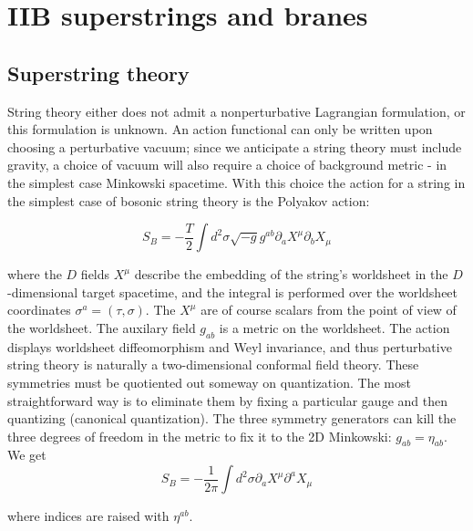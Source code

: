 \documentclass[11pt,a4paper,oneside,openright,titlepage]{book}
\author{Riccardo Antonelli}
\begin{document}
\frontmatter




\tableofcontents

\mainmatter

\chapter{IIB superstrings and branes}

\section{Superstring theory}

String theory either does not admit a nonperturbative Lagrangian formulation, or this formulation is unknown. An action functional can only be written upon choosing a perturbative vacuum; since we anticipate a string theory must include gravity, a choice of vacuum will also require a choice of background metric - in the simplest case Minkowski spacetime. With this choice the action for a string in the simplest case of bosonic string theory is the Polyakov action:

\begin{equation}
	S_B = -\frac{T}{2} \int d^2\sigma \sqrt{-g} g^{ab} \partial_a X^\mu \partial_b X_\mu
\end{equation}

where the $D$ fields $X^\mu$ describe the embedding of the string's worldsheet in the $D$-dimensional target spacetime, and the integral is performed over the worldsheet coordinates $\sigma^a = (\tau,\sigma)$. The $X^\mu$ are of course scalars from the point of view of the worldsheet. The auxilary field $g_{ab}$ is a metric on the worldsheet. The action displays worldsheet diffeomorphism and Weyl invariance, and thus perturbative string theory is naturally a two-dimensional conformal field theory. These symmetries must be quotiented out someway on quantization. The most straightforward way is to eliminate them by fixing a particular gauge and then quantizing (canonical quantization). The three symmetry generators can kill the three degrees of freedom in the metric to fix it to the 2D Minkowski: $g_{ab} = \eta_{ab}$. We get\\

\begin{equation}
	S_B = - \frac{1}{2\pi} \int d^2\sigma \partial_a X^\mu \partial^a X_\mu
\end{equation}

where indices are raised with $\eta^{ab}$.\\
\end{document}
